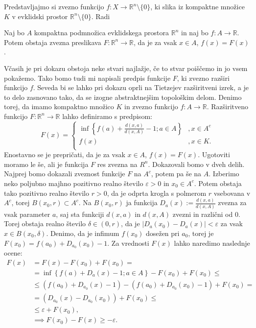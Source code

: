 \documentclass[mat1]{fmfdelo}
\newcommand{\R}{\mathbb R}
\newcommand{\0}{\underline{0}}
\begin{document}
Predstavljajmo si zvezno funkcijo $f : X \to \R^n \setminus \{0\}$, ki slika iz kompaktne množice $K$ v evklidski prostor $\R^n \setminus \{ 0 \}$. Radi 

\begin{lema}\label{razsiritev}
Naj bo $A$ kompaktna podmnožica evklidskega prostora $\R^n$ in naj bo \mbox{$f : A \to \R$}. Potem obstaja zvezna preslikava $F : \R^n \to \R$, da je za vsak $x \in A$, $f(x) = F(x)$.
\end{lema}

\begin{dokaz}
Včasih je pri dokazu obstoja neke stvari najlažje, če to stvar poiščemo in jo vsem pokažemo. Tako bomo tudi mi napisali predpis funkcije $F$, ki zvezno razširi funkcijo $f$. Seveda bi se lahko pri dokazu oprli na Tietzejev razširitveni izrek, a je to delo zasnovano tako, da se izogne abstraktnejšim topološkim delom. Denimo torej, da imamo kompaktno množico $K$ in zvezno funkcijo \mbox{$f : A \to \R$}.
Razširitveno funkcijo \mbox{$F : \R^n \to \R$} lahko definiramo s predpisom:
\[  F(x) = \left\{
\begin{array}{ll}
	\inf \left \{ f(a) + \frac{d(x, a)}{d(x, A)} - 1; a \in A \right \} &, x \in A^c \\
	f(x) &, x \in K. \\
\end{array} 
\right. \]
Enostavno se je prepričati, da je za vsak $x \in A$, $f(x) = F(x)$. Ugotoviti moramo le še, ali je funkcija $F$ res zvezna na $R^n$.
Dokazovali bomo v dveh delih. Najprej bomo dokazali zveznost funkcije $F$ na $A^c$, potem pa še na $A$.
Izberimo neko poljubno majhno pozitivno realno število $\varepsilon > 0$ in $x_0 \in A^c$. Potem obstaja tako pozitivno realno število $r>0$, da je odprta krogla s polmerom $r$ vsebovana v $A^c$, torej $B(x_0, r) \subset A^c$. Na $B(x_0, r)$ ja funkcija $D_a(x) := \frac{d(x, a)}{d(x, A)}$ zvezna za vsak parameter $a$, saj sta funkciji $d(x, a)$ in $d(x, A)$ zvezni in različni od $0$. Torej obstaja realno število $\delta \in (0, r)$, da je $|D_a(x_0) - D_a(x)| < \varepsilon$ za vsak $x \in B(x_0, \delta)$.
Denimo, da je infimum $f(x_0)$ dosežen pri $a_0$, torej je $F(x_0) = f(a_0) + D_{a_0}(x_0) - 1$. Za vrednosti $F(x)$ lahko naredimo naslednje ocene:
\begin{equation*} \label{eq1}
\begin{split}
F(x) & = F(x) - F(x_0) + F(x_0) = \\
& = \inf \left \{ f(a) + D_a(x) - 1; a \in A \right \} - F(x_0) + F(x_0) \leq \\
& \leq (f(a_0) + D_{a_0}(x) - 1) -  (f(a_0) + D_{a_0}(x_0) - 1) + F(x_0) = \\
& = (D_{a_0}(x) -  D_{a_0}(x_0)) + F(x_0) \leq \\
& \leq \varepsilon + F(x_0), \\
& \implies F(x_0) - F(x) \geq -\varepsilon.
\end{split}
\end{equation*}


\end{dokaz}
\end{document}
